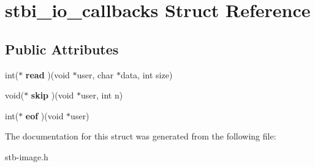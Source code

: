 \hypertarget{structstbi__io__callbacks}{}\section{stbi\+\_\+io\+\_\+callbacks Struct Reference}
\label{structstbi__io__callbacks}
\subsection*{Public Attributes}
\begin{DoxyCompactItemize}
\item 
\hypertarget{structstbi__io__callbacks_a623e46b3a2a019611601409926283a88}{}int($\ast$ {\bfseries read} )(void $\ast$user, char $\ast$data, int size)\label{structstbi__io__callbacks_a623e46b3a2a019611601409926283a88}

\item 
\hypertarget{structstbi__io__callbacks_a257aac5480a90a6c4b8fbe86c1b01068}{}void($\ast$ {\bfseries skip} )(void $\ast$user, int n)\label{structstbi__io__callbacks_a257aac5480a90a6c4b8fbe86c1b01068}

\item 
\hypertarget{structstbi__io__callbacks_a319639db2f76e715eed7a7a974136832}{}int($\ast$ {\bfseries eof} )(void $\ast$user)\label{structstbi__io__callbacks_a319639db2f76e715eed7a7a974136832}

\end{DoxyCompactItemize}


The documentation for this struct was generated from the following file\+:\begin{DoxyCompactItemize}
\item 
stb-\/image.\+h\end{DoxyCompactItemize}
